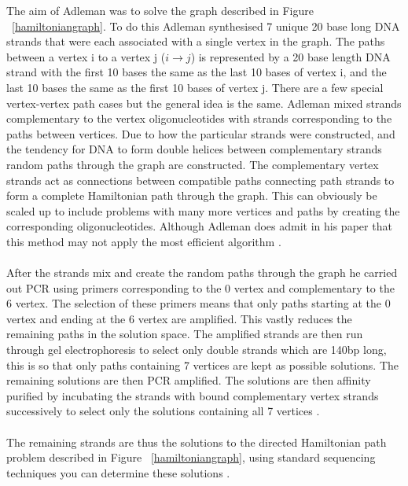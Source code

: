 \documentclass[11pt,a4paper,portrait]{article}
\begin{document}
The aim of Adleman was to solve the graph described in Figure ~\ref{hamiltoniangraph}. To do this Adleman synthesised 7 unique 20 base long DNA strands that were each associated with a single vertex in the graph. The paths between a vertex i to a vertex j ($i \rightarrow j$) is represented by a 20 base length DNA strand with the first 10 bases the same as the last 10 bases of vertex i, and the last 10 bases the same as the first 10 bases of vertex j. There are a few special vertex-vertex path cases but the general idea is the same. Adleman mixed strands complementary to the vertex oligonucleotides with strands corresponding to the paths between vertices. Due to how the particular strands were constructed, and the tendency for DNA to form double helices between complementary strands random paths through the graph are constructed. The complementary vertex strands act as connections between compatible paths connecting path strands to form a complete Hamiltonian path through the graph. This can obviously be scaled up to include problems with many more vertices and paths by creating the corresponding oligonucleotides. Although Adleman does admit in his paper that this method may not apply the most efficient algorithm \cite{Adleman1994}.
\\\\
After the strands mix and create the random paths through the graph he carried out PCR using primers corresponding to the 0 vertex and complementary to the 6 vertex. The selection of these primers means that only paths starting at the 0 vertex and ending at the 6 vertex are amplified. This vastly reduces the remaining paths in the solution space. The amplified strands are then run through gel electrophoresis to select only double strands which are 140bp long, this is so that only paths containing 7 vertices are kept as possible solutions. The remaining solutions are then PCR amplified. The solutions are then affinity purified by incubating the strands with bound complementary vertex strands successively to select only the solutions containing all 7 vertices \cite{Adleman1994}.
\\\\

The remaining strands are thus the solutions to the directed Hamiltonian path problem described in Figure ~\ref{hamiltoniangraph}, using standard sequencing techniques you can determine these solutions \cite{Adleman1994}.
\\\\

\clearpage
\end{document}
